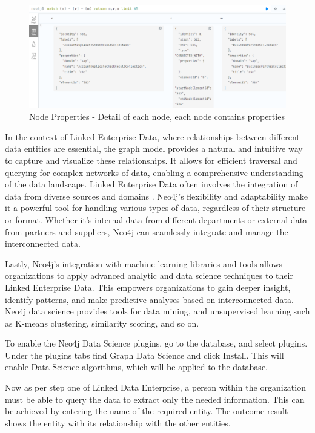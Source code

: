 \documentclass{article}
\begin{document}
\begin{figure}[ht!]
    \centering
    \includegraphics[scale=0.35]{neo4j-table}
    \caption{Node Properties - 
Detail of each node, each node contains properties}
    \label{fig:neo4j-table}
\end{figure}

In the context of Linked Enterprise Data, where relationships between different data entities are essential, the graph model provides a natural and intuitive way to capture and visualize these relationships. It allows for efficient traversal and querying for complex networks of data, enabling a comprehensive understanding of the data landscape. Linked Enterprise Data often involves the integration of data from diverse sources and domains \parencite{rao2017}. Neo4j’s flexibility and adaptability make it a powerful tool for handling various types of data, regardless of their structure or format. Whether it’s internal data from different departments or external data from partners and suppliers, Neo4j can seamlessly integrate and manage the interconnected data. 

Lastly, Neo4j’s integration with machine learning libraries and tools allows organizations to apply advanced analytic and data science techniques to their Linked Enterprise Data. This empowers organizations to gain deeper insight, identify patterns, and make predictive analyses based on interconnected data. Neo4j data science provides tools for data mining, and unsupervised learning such as K-means clustering, similarity scoring, and so on. \parencite{hodler2022a}

To enable the Neo4j Data Science plugins, go to the database, and select plugins. Under the plugins tabs find Graph Data Science and click Install. This will enable Data Science algorithms, which will be applied to the database. 

Now as per step one of Linked Data Enterprise, a person within the organization must be able to query the data to extract only the needed information. This can be achieved by entering the name of the required entity. The outcome result shows the entity with its relationship with the other entities.
\end{document}
